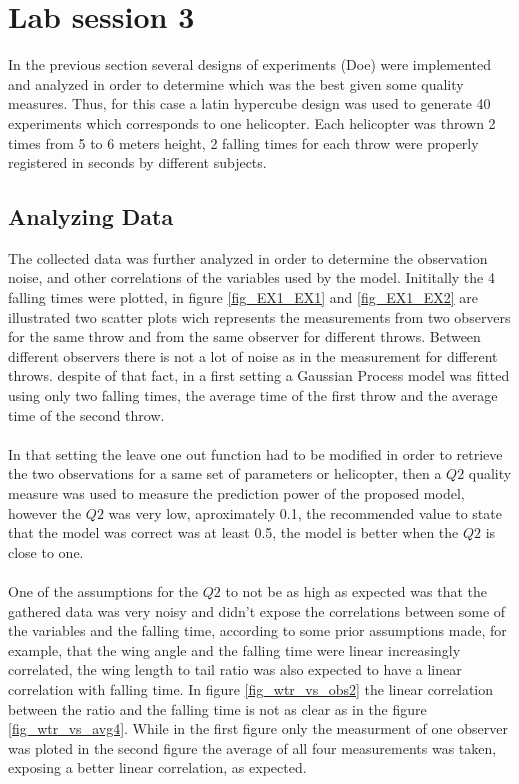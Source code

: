 \section{Lab session 3}

In the previous section several designs of experiments (Doe) were implemented and analyzed in order to determine which was the best given some quality measures. Thus, for this case a latin hypercube design was used to generate 40 experiments which corresponds to one helicopter. Each helicopter was thrown 2 times from 5 to 6 meters height, 2 falling times for each throw were properly registered in seconds by different subjects.

\subsection{Analyzing Data}

The collected data was further analyzed in order to determine the observation noise, and other correlations of the variables used by the model. Inititally the 4 falling times were plotted, in figure \ref{fig_EX1_EX1} and \ref{fig_EX1_EX2} are illustrated two scatter plots wich represents the measurements from two observers for the same throw and from the same observer for different throws. Between different observers there is not a lot of noise as in the measurement for different throws. despite of that fact, in a first setting a Gaussian Process model was fitted using only two falling times, the average time of the first throw and the average time of the second throw.

\paragraph{}
In that setting the leave one out function had to be modified in order to retrieve the two observations for a same set of parameters or helicopter, then a $Q2$ quality measure was used to measure the prediction power of the proposed model, however the $Q2$ was very low, aproximately 0.1, the recommended value to state that the model was correct was at least 0.5, the model is better when the $Q2$ is close to one.

\paragraph{}
One of the assumptions for the $Q2$ to not be as high as expected was that the gathered data was very noisy and didn't expose the correlations between some of the variables and the falling time, according to some prior assumptions made, for example, that the wing angle and the falling time were linear increasingly correlated, the wing length to tail ratio was also expected to have a linear correlation with falling time. In figure
\ref{fig_wtr_vs_obs2} the linear correlation between the ratio and the falling time is not as clear as in the figure \ref{fig_wtr_vs_avg4}. While in the first figure only the measurment of one observer was ploted in the second figure the average of all four measurements was taken, exposing a better linear correlation, as expected.



